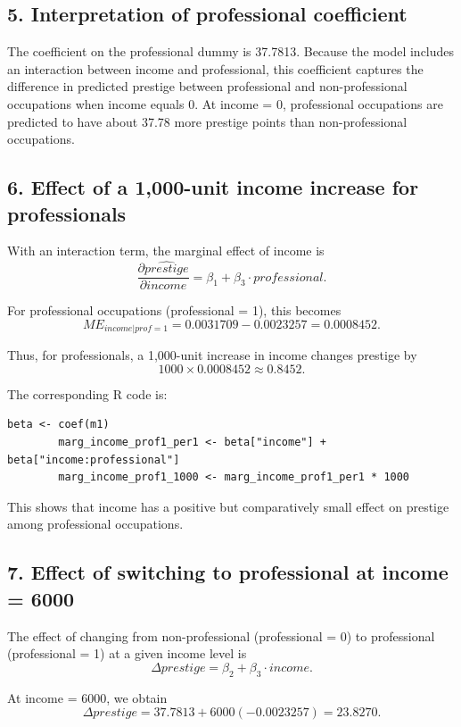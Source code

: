 \documentclass[12pt]{article}
\begin{document}
	\subsection*{5. Interpretation of professional coefficient}
	
	The coefficient on the professional dummy is 37.7813. Because the model
	includes an interaction between income and professional, this coefficient
	captures the difference in predicted prestige between professional and
	non-professional occupations when income equals 0. At income = 0,
	professional occupations are predicted to have about 37.78 more prestige
	points than non-professional occupations.
	
	\subsection*{6. Effect of a 1{,}000-unit income increase for professionals}
	
	With an interaction term, the marginal effect of income is
	\[
	\frac{\partial \widehat{prestige}}{\partial income}
	= \beta_1 + \beta_3 \cdot professional.
	\]
	
	For professional occupations (professional = 1), this becomes
	\[
	ME_{income|prof=1} = 0.0031709 - 0.0023257 = 0.0008452.
	\]
	
	Thus, for professionals, a 1{,}000-unit increase in income changes prestige by
	\[
	1000 \times 0.0008452 \approx 0.8452.
	\]
	
	The corresponding R code is:
	
	\begin{lstlisting}[style=RStyle]
		beta <- coef(m1)
		marg_income_prof1_per1 <- beta["income"] + beta["income:professional"]
		marg_income_prof1_1000 <- marg_income_prof1_per1 * 1000
	\end{lstlisting}
	
	This shows that income has a positive but comparatively small effect on
	prestige among professional occupations.
	
	\subsection*{7. Effect of switching to professional at income = 6000}
	
	The effect of changing from non-professional (professional = 0) to
	professional (professional = 1) at a given income level is
	\[
	\Delta prestige = \beta_2 + \beta_3 \cdot income.
	\]
	
	At income = 6000, we obtain
	\[
	\Delta prestige = 37.7813 + 6000(-0.0023257) = 23.8270.
	\]
	
\end{document}

